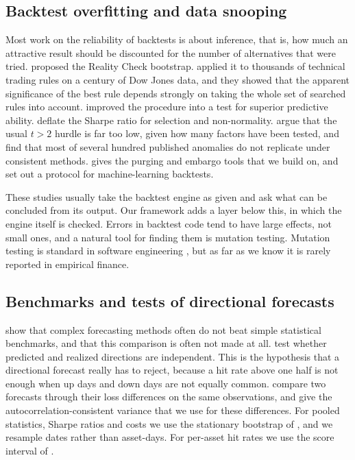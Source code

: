 \documentclass[preprint,12pt,authoryear,a4paper]{elsarticle}
\begin{document}
\subsection{Backtest overfitting and data snooping}

Most work on the reliability of backtests is about inference, that is, how much an
attractive result should be discounted for the number of alternatives that were
tried. \citet{white2000reality} proposed the Reality Check bootstrap.
\citet{sullivan1999data} applied it to thousands of technical trading rules on a
century of Dow Jones data, and they showed that the apparent significance of the
best rule depends strongly on taking the whole set of searched rules into account.
\citet{hansen2005test} improved the procedure into a test for superior predictive
ability. \citet{bailey2014deflated} deflate the Sharpe ratio for selection and
non-normality. \citet{harvey2016cross} argue that the usual $t>2$ hurdle is far too
low, given how many factors have been tested, and \citet{hou2020replicating} find
that most of several hundred published anomalies do not replicate under consistent
methods. \citet{lopezdeprado2018advances} gives the purging and embargo tools that
we build on, and \citet{arnott2019backtesting} set out a protocol for
machine-learning backtests.

These studies usually take the backtest engine as given and ask what can be
concluded from its output. Our framework adds a layer below this, in which the
engine itself is checked. Errors in backtest code tend to have large effects, not
small ones, and a natural tool for finding them is mutation testing. Mutation
testing is standard in software engineering \citep{jia2011analysis}, but as far as
we know it is rarely reported in empirical finance.

\subsection{Benchmarks and tests of directional forecasts}

\citet{makridakis2018statistical} show that complex forecasting methods often do
not beat simple statistical benchmarks, and that this comparison is often not made
at all. \citet{pesaran1992simple} test whether predicted and realized directions
are independent. This is the hypothesis that a directional forecast really has to
reject, because a hit rate above one half is not enough when up days and down days
are not equally common. \citet{diebold1995comparing} compare two forecasts through
their loss differences on the same observations, and \citet{newey1987simple} give
the autocorrelation-consistent variance that we use for these differences. For
pooled statistics, Sharpe ratios and costs we use the stationary bootstrap of
\citet{politis1994stationary}, and we resample dates rather than asset-days. For
per-asset hit rates we use the score interval of \citet{wilson1927probable}.
\end{document}
